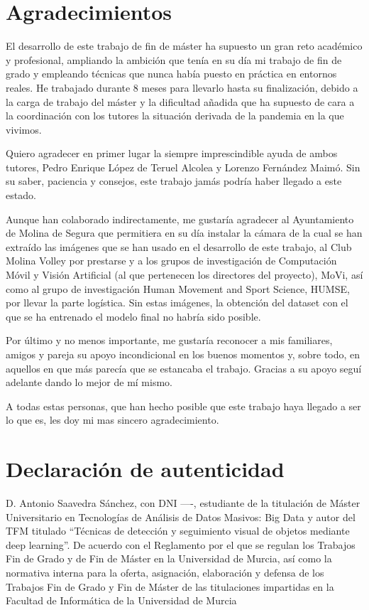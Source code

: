 \section*{Agradecimientos}

El desarrollo de este trabajo de fin de máster ha supuesto un gran reto académico y profesional, ampliando la ambición que tenía en su día mi trabajo de fin de grado y empleando técnicas que nunca había puesto en práctica en entornos reales. He trabajado durante 8 meses para llevarlo hasta su finalización, debido a la carga de trabajo del máster y la dificultad añadida que ha supuesto de cara a la coordinación con los tutores la situación derivada de la pandemia en la que vivimos.

Quiero agradecer en primer lugar la siempre imprescindible ayuda de ambos tutores, Pedro Enrique López de Teruel Alcolea y Lorenzo Fernández Maimó. Sin su saber, paciencia y consejos, este trabajo jamás podría haber llegado a este estado.

Aunque han colaborado indirectamente, me gustaría agradecer al Ayuntamiento de Molina de Segura que permitiera en su día instalar la cámara de la cual se han extraído las imágenes que se han usado en el desarrollo de este trabajo, al Club Molina Volley por prestarse y a los grupos de investigación de Computación Móvil y Visión Artificial (al que pertenecen los directores del proyecto), MoVi, así como al grupo de investigación Human Movement and Sport Science, HUMSE, por llevar la parte logística. Sin estas imágenes, la obtención del dataset con el que se ha entrenado el modelo final no habría sido posible.

Por último y no menos importante, me gustaría reconocer a mis familiares, amigos y pareja su apoyo incondicional en los buenos momentos y, sobre todo, en aquellos en que más parecía que se estancaba el trabajo. Gracias a su apoyo seguí adelante dando lo mejor de mí mismo.

A todas estas personas, que han hecho posible que este trabajo haya llegado a ser lo que es, les doy mi mas sincero agradecimiento.
\newpage
\section*{Declaración de autenticidad}

D. Antonio Saavedra Sánchez, con DNI ----, estudiante de la titulación de Máster Universitario en Tecnologías de Análisis de Datos Masivos: Big Data y autor del TFM titulado ``Técnicas de detección y seguimiento visual de objetos mediante deep learning''. De acuerdo con el Reglamento por el que se regulan los Trabajos Fin de Grado y de Fin de Máster en la Universidad de Murcia, así como la normativa interna para la oferta, asignación, elaboración y defensa de los Trabajos Fin de Grado y Fin de Máster de las titulaciones impartidas en la Facultad de Informática de la Universidad de Murcia

